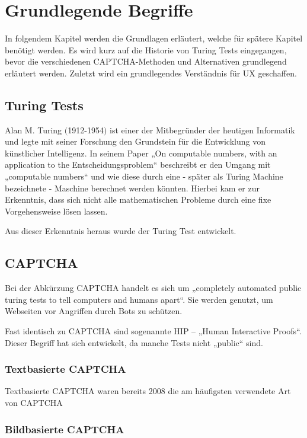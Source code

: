 \chapter{Grundlegende Begriffe}
\label{ch:basics}
In folgendem Kapitel werden die Grundlagen erläutert, welche für spätere Kapitel benötigt werden. 
Es wird kurz auf die Historie von Turing Tests eingegangen, 
bevor die verschiedenen CAPTCHA-Methoden und Alternativen grundlegend erläutert werden. 
Zuletzt wird ein grundlegendes Verständnis für UX geschaffen.

\section{Turing Tests}
\label{ch:basics:turing}
Alan M. Turing $($1912-1954$)$ ist einer der Mitbegründer der heutigen Informatik 
und legte mit seiner Forschung den Grundstein für die Entwicklung von künstlicher Intelligenz. 
In seinem Paper „On computable numbers, with an application to the Entscheidungsproblem“ %
beschreibt er den Umgang mit „computable numbers“ und wie diese durch eine - später als Turing Machine bezeichnete - Maschine berechnet werden könnten. 
Hierbei kam er zur Erkenntnis, dass sich nicht alle mathematischen Probleme durch eine fixe Vorgehensweise lösen lassen. %

Aus dieser Erkenntnis heraus wurde der Turing Test entwickelt. 

\section{CAPTCHA}
Bei der Abkürzung CAPTCHA handelt es sich um „completely automated public turing tests to tell computers and humans apart“. 
Sie werden genutzt, um Webseiten vor Angriffen durch Bots zu schützen. 

Fast identisch zu CAPTCHA sind sogenannte HIP – „Human Interactive Proofs“. 
Dieser Begriff hat sich entwickelt, da manche Tests nicht „public“ sind. %


\subsection{Textbasierte CAPTCHA}

Textbasierte CAPTCHA waren bereits 2008 die am häufigsten verwendete Art von CAPTCHA 


\subsection{Bildbasierte CAPTCHA}
